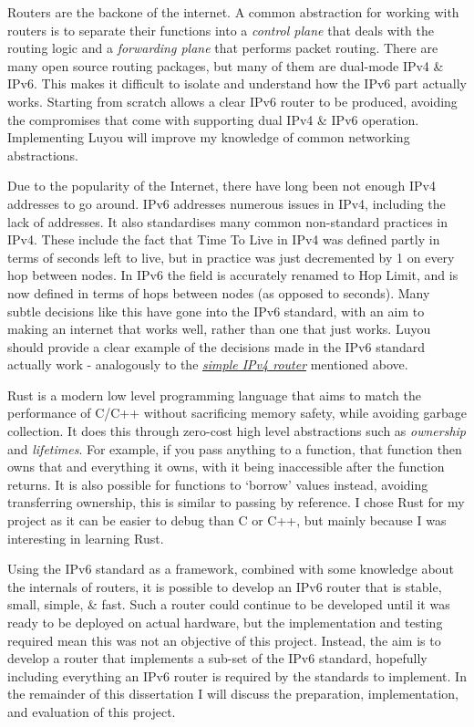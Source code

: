 \documentclass[12pt,a4paper,twoside,openright]{report}
\begin{document}
Routers are the backone of the internet. A common abstraction for working with routers is to separate their functions into a \textit{control plane} that deals with the routing logic and a \textit{forwarding plane} that performs packet routing. There are many open source routing packages\cite{open_source_routing}, but many of them are dual-mode IPv4 \& IPv6. This makes it difficult to isolate and understand how the IPv6 part actually works.  Starting from scratch allows a clear IPv6 router to be produced, avoiding the compromises that come with supporting dual IPv4 \& IPv6 operation.  Implementing Luyou will improve my knowledge of common networking abstractions.

\bigskip

Due to the popularity of the Internet, there have long been not enough IPv4\cite{ipv4_rfc} addresses to go around. IPv6 addresses numerous issues in IPv4, including the lack of addresses. It also standardises many common non-standard practices in IPv4. These include the fact that Time To Live in IPv4 was defined partly in terms of seconds left to live, but in practice was just decremented by 1 on every hop between nodes. In IPv6 the field is accurately renamed to Hop Limit, and is now defined in terms of hops between nodes (as opposed to seconds). Many subtle decisions like this have gone into the IPv6 standard, with an aim to making an internet that works well, rather than one that just works. Luyou should provide a clear example of the decisions made in the IPv6 standard actually work - analogously to the \hyperref[lab::simple_router]{\textit{simple IPv4 router}}\cite{simple_router} mentioned above.

\bigskip

Rust\cite{rust} is a modern low level programming language that aims to match the performance of C/C++ without sacrificing memory safety, while avoiding garbage collection. It does this through zero-cost high level abstractions such as \textit{ownership} and \textit{lifetimes}. For example, if you pass anything to a function, that function then owns that and everything it owns, with it being inaccessible after the function returns. It is also possible for functions to `borrow' values instead, avoiding transferring ownership, this is similar to passing by reference.  I chose Rust for my project as it can be easier to debug than C or C++, but mainly because I was interesting in learning Rust.

\bigskip

Using the IPv6 standard as a framework, combined with some knowledge about the internals of routers, it is possible to develop an IPv6 router that is stable, small, simple, \& fast.  Such a router could continue to be developed until it was ready to be deployed on actual hardware, but the implementation and testing required mean this was not an objective of this project.  Instead, the aim is to develop a router that implements a sub-set of the IPv6 standard, hopefully including everything an IPv6 router is required by the standards to implement.  In the remainder of this dissertation I will discuss the preparation, implementation, and evaluation of this project.
\end{document}

